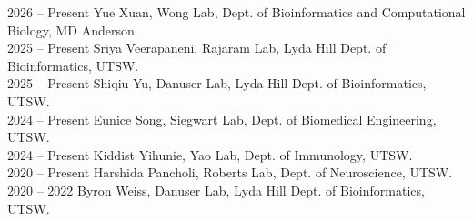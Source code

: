 2026 -- Present \hspace{14pt} Yue Xuan, Wong Lab, Dept. of Bioinformatics and Computational Biology, MD Anderson. \\
2025 -- Present \hspace{14pt} Sriya Veerapaneni, Rajaram Lab, Lyda Hill Dept. of Bioinformatics, UTSW. \\
2025 -- Present \hspace{14pt} Shiqiu Yu, Danuser Lab, Lyda Hill Dept. of Bioinformatics, UTSW. \\
2024 -- Present \hspace{14pt} Eunice Song, Siegwart Lab, Dept. of Biomedical Engineering, UTSW. \\
2024 -- Present \hspace{14pt} Kiddist Yihunie, Yao Lab, Dept. of Immunology, UTSW. \\
2020 -- Present \hspace{14pt} Harshida Pancholi, Roberts Lab, Dept. of Neuroscience, UTSW. \\
2020 -- 2022 \hspace{28pt} Byron Weiss, Danuser Lab, Lyda Hill Dept. of Bioinformatics, UTSW. \\
